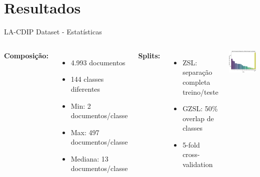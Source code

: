 \section{Resultados}

\begin{frame}{LA-CDIP Dataset - Estatísticas}
\begin{columns}
\textbf{Composição:}
\begin{itemize}
    \item 4.993 documentos
    \item 144 classes diferentes
    \item Min: 2 documentos/classe
    \item Max: 497 documentos/classe
    \item Mediana: 13 documentos/classe
\end{itemize}

\textbf{Splits:}
\begin{itemize}
    \item ZSL: separação completa treino/teste
    \item GZSL: 50\% overlap de classes
    \item 5-fold cross-validation
\end{itemize}

\includegraphics[width=\textwidth]{images/hist2.eps}
\end{columns}
\end{frame}

